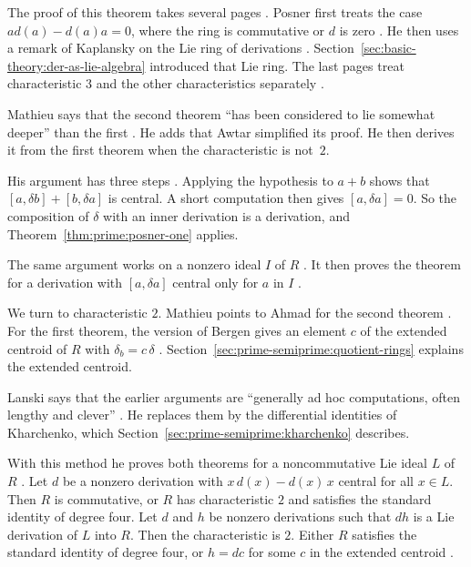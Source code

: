The proof of this theorem takes several pages \cite[pp.~1094--1100]{Posner1957}.
Posner first treats the case $ad(a)-d(a)a=0$, where the ring is commutative or
$d$ is zero \cite[Lemma~3, pp.~1094--1095]{Posner1957}. He then uses a remark
of Kaplansky on the Lie ring of derivations
\cite[Lemma~4, pp.~1096--1097]{Posner1957}. Section~\ref{sec:basic-theory:der-as-lie-algebra}
introduced that Lie ring. The last pages treat characteristic $3$ and the other
characteristics separately \cite[pp.~1097--1100]{Posner1957}.

Mathieu says that the second theorem ``has been considered to lie somewhat
deeper'' than the first \cite[p.~601]{Mathieu1992}. He adds that Awtar
simplified its proof. He then derives it from the first theorem when the
characteristic is not~$2$.

His argument has three steps \cite[pp.~601--602]{Mathieu1992}. Applying the
hypothesis to $a+b$ shows that $[a,\delta b]+[b,\delta a]$ is central. A short
computation then gives $[a,\delta a]=0$. So the composition of $\delta$ with an
inner derivation is a derivation, and Theorem~\ref{thm:prime:posner-one}
applies.

The same argument works on a nonzero ideal $I$ of $R$
\cite[p.~601]{Mathieu1992}. It then proves the theorem for a derivation with
$[a,\delta a]$ central only for $a$ in $I$ \cite[p.~601]{Mathieu1992}.

We turn to characteristic $2$. Mathieu points to Ahmad for the second theorem
\cite[pp.~601--602]{Mathieu1992}. For the first theorem, the version of Bergen
gives an element $c$ of the extended centroid of $R$ with $\delta_b=c\,\delta$
\cite[Remark~2, p.~602]{Mathieu1992}.
Section~\ref{sec:prime-semiprime:quotient-rings} explains the extended centroid.

Lanski says that the earlier arguments are ``generally ad hoc computations,
often lengthy and clever'' \cite[p.~276]{Lanski1988}. He replaces them by the
differential identities of Kharchenko, which
Section~\ref{sec:prime-semiprime:kharchenko} describes.

With this method he proves both theorems for a noncommutative Lie ideal $L$ of
$R$ \cite[p.~276]{Lanski1988}. Let $d$ be a nonzero derivation with
$x\,d(x)-d(x)\,x$ central for all $x\in L$. Then $R$ is commutative, or $R$ has
characteristic $2$ and satisfies the standard identity of degree four.
Let $d$ and $h$ be nonzero derivations such that $dh$ is a Lie derivation of
$L$ into $R$. Then the characteristic is $2$. Either $R$ satisfies the
standard identity of degree four, or $h=dc$ for some $c$ in the extended
centroid \cite[p.~276]{Lanski1988}.


